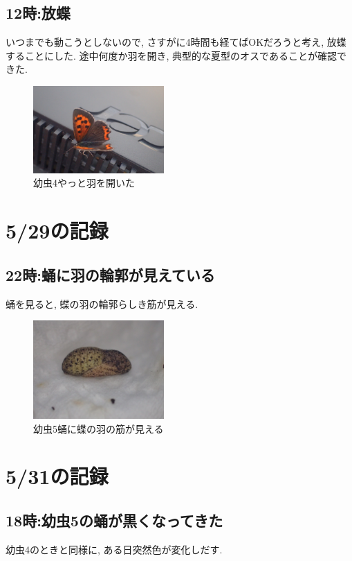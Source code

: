 \documentclass{jsarticle}
\begin{document}
\subsection{12時:放蝶}
いつまでも動こうとしないので, さすがに4時間も経てばOKだろうと考え, 放蝶することにした. 
途中何度か羽を開き, 典型的な夏型のオスであることが確認できた. 

\begin{figure}[htbp]
  \begin{center}
    \includegraphics[width=5cm]{photo12/Larva4-fly.JPG}
  \end{center}
  \caption{幼虫4やっと羽を開いた}
\end{figure}

\section{5/29の記録}
\subsection{22時:蛹に羽の輪郭が見えている}
蛹を見ると, 蝶の羽の輪郭らしき筋が見える. 

\begin{figure}[htbp]
  \begin{center}
    \includegraphics[width=5cm]{photo13/Larva5-pupa.JPG}
  \end{center}
  \caption{幼虫5蛹に蝶の羽の筋が見える}
\end{figure}

\section{5/31の記録}
\subsection{18時:幼虫5の蛹が黒くなってきた}
幼虫4のときと同様に, ある日突然色が変化しだす. 
\end{document}
